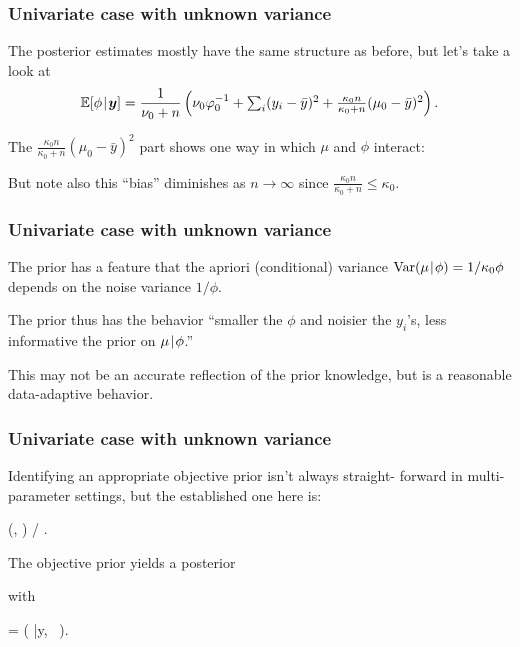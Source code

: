 \documentclass[18pt, handout]{beamer}
\newcommand{\defineTightItemizeSpacing}{%
	\setlength{\abovedisplayskip}{.25\baselineskip}%
	\setlength{\belowdisplayskip}{.25\baselineskip}%
}
\newenvironment{tightEquation*}{%
	\defineTightItemizeSpacing%
	\begin{equation*}
}{
	\end{equation*} \ignorespacesafterend
}
\newcommand{\given}{\thinnerspace | \thinnerspace}
\newcommand{\thinnerspace}{\mskip.5\thinmuskip}
\newcommand{\expectation}{\mathbb{E}}
\newcommand{\variance}{\mathrm{Var}}
\newcommand{\normalDist}{\mathcal{N}}
\newcommand{\gammaDist}{\mathrm{Gamma}}
\newcommand{\density}{\pi}
\begin{document}
\begin{frame}
\frametitle{Univariate case with unknown variance}
The posterior estimates mostly have the same structure as before, but let's take a look at
\begin{equation*}
\expectation[ \phi \given \bm{y} ]
	= \frac{1}{\nu_0 + n} \left(
		\nu_0 \varphi_0^{-1} 
		+ \textstyle \sum_i (y_i - \bar{y})^2
		+ \frac{\kappa_0 n}{\kappa_0 + n} (\mu_0 - \bar{y} )^2
	\right).
\end{equation*}

The $\frac{\kappa_0 n}{\kappa_0 + n} (\mu_0 - \bar{y} )^2$ part shows one way in which $\mu$ and $\phi$ interact:
\begin{tightEquation*}
%
\end{tightEquation*}

\smallskip
But note also this ``bias'' diminishes as $n \to \infty$ since $\frac{\kappa_0 n}{\kappa_0 + n} \leq \kappa_0$.
\end{frame}


\begin{frame}
\frametitle{Univariate case with unknown variance}
The prior has a feature that the apriori (conditional) variance $\variance(\mu \given \phi) = 1 / \kappa_0 \phi$ depends on the noise variance $1 / \phi$.

\smallskip
The prior thus has the behavior ``smaller the $\phi$ and noisier the $y_i$'s, less informative the prior on $\mu \given \phi$.''

\smallskip
This may not be an accurate reflection of the prior knowledge, but is a reasonable data-adaptive behavior.
\end{frame}


\begin{frame}
\frametitle{Univariate case with unknown variance}
Identifying an appropriate objective prior isn't always straight- forward in multi-parameter settings, but the established one here is:
\begin{tightEquation*}
\density(\mu, \phi)  / \phi.
\end{tightEquation*}

The objective prior yields a posterior
with
\begin{tightEquation*}
\expectation\!\left[ 
	(\mu, \phi) \given \bm{y}
\right]
	= \left( 
		\bar{y}, \, 
	\right).
\end{tightEquation*}
\end{frame}
\end{document}
